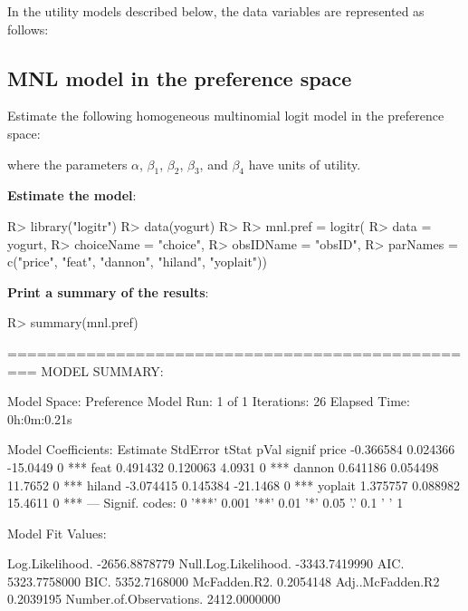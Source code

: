 \documentclass[article]{jss}
\begin{document}
In the utility models described below, the data variables are
represented as follows:



\newpage

\hypertarget{mnl-model-in-the-preference-space}{%
\subsection{MNL model in the preference
space}\label{mnl-model-in-the-preference-space}}

Estimate the following homogeneous multinomial logit model in the
preference space:



where the parameters \(\alpha\), \(\beta_1\), \(\beta_2\), \(\beta_3\),
and \(\beta_4\) have units of utility.

\textbf{Estimate the model}:

\begin{CodeChunk}

\begin{CodeInput}
R> library("logitr")
R> data(yogurt)
R> 
R> mnl.pref = logitr(
R>   data       = yogurt,
R>   choiceName = "choice",
R>   obsIDName  = "obsID",
R>   parNames   = c("price", "feat", "dannon", "hiland", "yoplait"))
\end{CodeInput}
\end{CodeChunk}

\textbf{Print a summary of the results}:

\begin{CodeChunk}

\begin{CodeInput}
R> summary(mnl.pref)
\end{CodeInput}

\begin{CodeOutput}
=================================================
MODEL SUMMARY: 
                         
Model Space:   Preference
Model Run:         1 of 1
Iterations:            26
Elapsed Time: 0h:0m:0.21s

Model Coefficients: 
         Estimate StdError    tStat pVal signif
price   -0.366584 0.024366 -15.0449    0    ***
feat     0.491432 0.120063   4.0931    0    ***
dannon   0.641186 0.054498  11.7652    0    ***
hiland  -3.074415 0.145384 -21.1468    0    ***
yoplait  1.375757 0.088982  15.4611    0    ***
---
Signif. codes:  0 '***' 0.001 '**' 0.01 '*' 0.05 '.' 0.1 ' ' 1

Model Fit Values: 
                                     
Log.Likelihood.         -2656.8878779
Null.Log.Likelihood.    -3343.7419990
AIC.                     5323.7758000
BIC.                     5352.7168000
McFadden.R2.                0.2054148
Adj..McFadden.R2            0.2039195
Number.of.Observations.  2412.0000000
\end{CodeOutput}
\end{CodeChunk}
\end{document}
